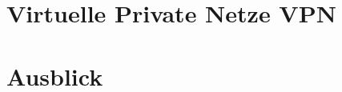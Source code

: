 \documentclass[hyperref={pdfpagelabels=false},xcolor=dvipsnames]{beamer}
\begin{document}


\section{Virtuelle Private Netze VPN}

\begin{frame}
	
\end{frame}

\begin{frame}
	
\end{frame}

\section{Ausblick}

\begin{frame}
	
\end{frame}
\end{document}
